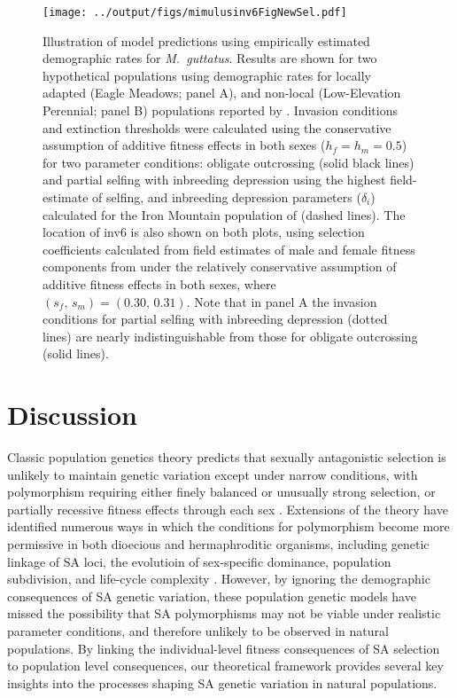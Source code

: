 \documentclass[11pt,draft]{article}
\begin{document}
\begin{figure}[htbp]
 \centering
 \texttt{[image: ../output/figs/mimulusinv6FigNewSel.pdf]}
 \caption{\footnotesize{Illustration of model predictions using empirically estimated demographic rates for {\itshape M.~guttatus}. Results are shown for two hypothetical populations using demographic rates for locally adapted (Eagle Meadows; panel A), and non-local (Low-Elevation Perennial; panel B) populations reported by \citet{PetersonEtAl2016}. Invasion conditions and extinction thresholds were calculated using the conservative assumption of additive fitness effects in both sexes ($h_f = h_m = 0.5$) for two parameter conditions: obligate outcrossing (solid black lines)  and partial selfing with inbreeding depression using the highest field-estimate of selfing, and inbreeding depression parameters ($\delta_i$) calculated for the Iron Mountain population of \citet{Willis1993} (dashed lines). The location of inv6 is also shown on both plots, using selection coefficients calculated from field estimates of male and female fitness components from \citet{LeeKelly2015} under the relatively conservative assumption of additive fitness effects in both sexes, where $(s_f,\,s_m) = (0.30,\, 0.31)$. Note that in panel A the invasion conditions for partial selfing with inbreeding depression (dotted lines) are nearly indistinguishable from those for obligate outcrossing (solid lines).}} 
 \label{fig:mimulusFig}
 \end{figure}





\section*{Discussion}

Classic population genetics theory predicts that sexually antagonistic selection is unlikely to maintain genetic variation except under narrow conditions, with polymorphism requiring either finely balanced or unusually strong selection, or partially recessive fitness effects through each sex \citep{Kidwell1977,Pamilo1979,Prout2000, ConnallonClark2014}. Extensions of the theory have identified numerous ways in which the conditions for polymorphism become more permissive in both dioecious and hermaphroditic organisms, including genetic linkage of SA loci, the evolutioin of sex-specific dominance, population subdivision, and life-cycle complexity \citep[e.g.,][]{Patten2010,JordanConnallon2014,JordanCharlesworth2012,SpencerPriest2016, ConnallonSharmaOlito2019, Olito-etal-2018}. However, by ignoring the demographic consequences of SA genetic variation, these population genetic models have missed the possibility that SA polymorphisms may not be viable under realistic parameter conditions, and therefore unlikely to be observed in natural populations. By linking the individual-level fitness consequences of SA selection to population level consequences, our theoretical framework provides several key insights into the processes shaping SA genetic variation in natural populations.
\end{document}
